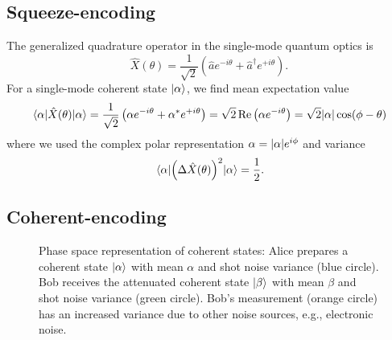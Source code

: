 \FloatBarrier
\subsection{Squeeze-encoding}

The generalized quadrature operator in the single-mode quantum optics is~\cite[p.~36]{Barnett2002}
\begin{equation}
	\hat{X}(\theta)
	=
	\frac{1}{\sqrt{2}}
	\left(
		\hat{a}
		e^{-i\theta}
		+
		\hat{a}^\dagger
		e^{+i\theta}
	\right)
	.
\end{equation}
For a single-mode coherent state $\ket{\alpha}$, we find mean expectation value
\begin{equation}
	\expval{\hat{X}(\theta)}{\alpha}
	=
	\frac{1}{\sqrt{2}}
	\left(
		\alpha
		e^{-i\theta}
		+
		\alpha^*
		e^{+i\theta}
	\right)
	=
	\sqrt{2}
	\operatorname{\operatorname{Re}}\left(
		\alpha
		e^{-i\theta}
	\right)
	=
	\sqrt{2}
	\abs{\alpha}
	\cos(\phi-\theta)
\end{equation}
where we used the complex polar representation $\alpha=\abs{\alpha}e^{i\phi}$ and variance~\cite[p.~59]{Barnett2002}
\begin{equation}
	\expval{\left(\Delta\hat{X}(\theta)\right)^2}{\alpha}
	=
	\frac{1}{2}
	.
\end{equation}


\FloatBarrier
\subsection{Coherent-encoding}




\begin{figure}[htb]
	\centering
	
	\caption{Phase space representation of coherent states: Alice prepares a coherent state $\ket{\alpha}$ with mean $\alpha$ and shot noise variance (blue circle). Bob receives the attenuated coherent state $\ket{\beta}$ with mean $\beta$ and shot noise variance (green circle). Bob's measurement (orange circle) has an increased variance due to other noise sources, e.g., electronic noise.}
\end{figure}

